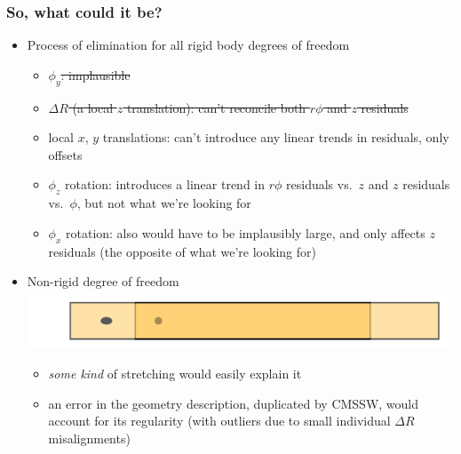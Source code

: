 \documentclass[compress]{beamer}
\begin{document}
\begin{frame}
\frametitle{So, what could it be?}

\begin{itemize}
\item Process of elimination for all rigid body degrees of freedom

\begin{itemize}
\item \sout{$\phi_y$: implausible}
\item \sout{$\Delta R$ (a local $z$ translation): can't reconcile both $r\phi$ and $z$ residuals}
\item local $x$, $y$ translations: can't introduce any linear trends in residuals, only offsets
\item $\phi_z$ rotation: introduces a linear trend in $r\phi$
  residuals vs.\ $z$ and $z$ residuals vs.\ $\phi$, but not what we're
  looking for
\item $\phi_x$ rotation: also would have to be implausibly large, and only affects $z$ residuals (the opposite of what we're looking for)
\end{itemize}

\item Non-rigid degree of freedom \hfill \includegraphics[width=0.35\linewidth]{stretch_explanation.png}

\begin{itemize}
\item {\it some kind} of stretching would easily explain it
\item an error in the geometry description, duplicated by CMSSW, would
  account for its regularity (with outliers due to small individual
  $\Delta R$ misalignments)
\end{itemize}
\end{itemize}
\end{frame}
\end{document}
